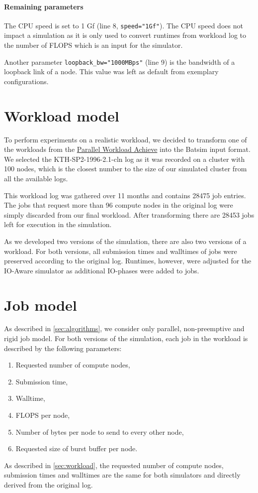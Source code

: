 \documentclass[thesis-en.tex]{subfiles}
\begin{document}
\paragraph{Remaining parameters}
The CPU speed is set to 1 Gf (line 8, \verb|speed="1Gf"|). The CPU speed does not impact a simulation as it is only used to convert runtimes from workload log to the number of FLOPS which is an input for the simulator.

Another parameter \verb|loopback_bw="1000MBps"| (line 9) is the bandwidth of a loopback link of a node. This value was left as default from exemplary configurations.

\section{Workload model} \label{sec:workload}
To perform experiments on a realistic workload, we decided to transform one of the workloads from the \href{https://www.cs.huji.ac.il/labs/parallel/workload/}{Parallel Workload Achieve} into the Batsim input format. We selected the KTH-SP2-1996-2.1-cln log as it was recorded on a cluster with 100 nodes, which is the closest number to the size of our simulated cluster from all the available logs. 

This workload log was gathered over 11 months and contains 28475 job entries. The jobs that request more than 96 compute nodes in the original log were simply discarded from our final workload. After transforming there are 28453 jobs left for execution in the simulation. 

As we developed two versions of the simulation, there are also two versions of a workload. For both versions, all submission times and walltimes of jobs were preserved according to the original log. Runtimes, however, were adjusted for the IO-Aware simulator as additional IO-phases were added to jobs.

\section{Job model} \label{sec:job}
As described in \autoref{sec:algorithms}, we consider only parallel, non-preemptive and rigid job model. For both versions of the simulation, each job in the workload is described by the following parameters:
\begin{enumerate}
    \item Requested number of compute nodes,
    \item Submission time,
    \item Walltime,
    \item FLOPS per node,
    \item Number of bytes per node to send to every other node,
    \item Requested size of burst buffer per node.
\end{enumerate}
As described in \autoref{sec:workload}, the requested number of compute nodes, submission times and walltimes are the same for both simulators and directly derived from the original log.
\end{document}
